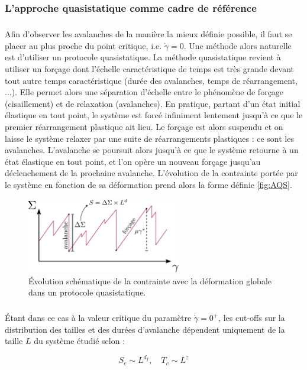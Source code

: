 \subsubsection{L'approche quasistatique comme cadre de référence}

\subparagraph{}Afin d'observer les avalanches de la manière la mieux définie possible, il faut se placer au plus proche du point critique, i.e. $\dot{\gamma} = 0$. Une méthode alors naturelle est d'utiliser un protocole quasistatique. La méthode quasistatique revient à utiliser un forçage dont l'échelle caractéristique de temps est très grande devant tout autre temps caractéristique (durée des avalanches, temps de réarrangement, ...). Elle permet alors une séparation d'échelle entre le phénomène de forçage (cisaillement) et de relaxation (avalanches). En pratique, partant d'un état initial élastique en tout point, le système est forcé infiniment lentement jusqu'à ce que le premier réarrangement plastique ait lieu. Le forçage est alors suspendu et on laisse le système relaxer par une suite de réarrangements plastiques : ce sont les avalanches. L'avalanche se poursuit alors jusqu'à ce que le système retourne à un état élastique en tout point, et l'on opère un nouveau forçage jusqu'au déclenchement de la prochaine avalanche. L'évolution de la contrainte portée par le système en fonction de sa déformation prend alors la forme définie \autoref{fig:AQS}.

\begin{figure}[h]
	\centering
	\includegraphics[width= 0.6\textwidth]{Chapitre4/Figures/Avalanches/AQS.pdf}
	\caption{Évolution schématique de la contrainte avec la déformation globale dans un protocole quasistatique.}
	\label{fig:AQS}
\end{figure}

\subparagraph{}Étant dans ce cas à la valeur critique du paramètre $\dot{\gamma} = 0^+$, les cut-offs sur la distribution des tailles et des durées d'avalanche dépendent uniquement de la taille $L$ du système étudié selon :

\begin{equation}
	S_c \sim L^{d_f}, \quad T_c \sim L^z
\end{equation}


